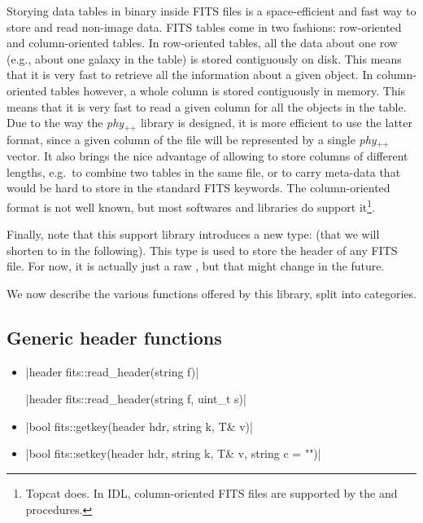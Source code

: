 \documentclass[12pt]{report}
\newcommand{\phypp}{\textit{phy}$_{\text{++}}$\xspace}
\begin{document}
Storying data tables in binary inside FITS files is a space-efficient and fast way to store and read non-image data. FITS tables come in two fashions: row-oriented and column-oriented tables. In row-oriented tables, all the data about one row (e.g., about one galaxy in the table) is stored contiguously on disk. This means that it is very fast to retrieve all the information about a given object. In column-oriented tables however, a whole column is stored contiguously in memory. This means that it is very fast to read a given column for all the objects in the table. Due to the way the \phypp library is designed, it is more efficient to use the latter format, since a given column of the file will be represented by a single \phypp vector. It also brings the nice advantage of allowing to store columns of different lengths, e.g.~to combine two tables in the same file, or to carry meta-data that would be hard to store in the standard FITS keywords. The column-oriented format is not well known, but most softwares and libraries do support it\footnote{Topcat does. In IDL, column-oriented FITS files are supported by the  and  procedures.}.

Finally, note that this support library introduces a new type:  (that we will shorten to  in the following). This type is used to store the header of any FITS file. For now, it is actually just a raw , but that might change in the future.

We now describe the various functions offered by this library, split into categories.

\subsection{Generic header functions}

\begin{itemize}
\item \cppinline|header fits::read_header(string f)| 

\cppinline|header fits::read_header(string f, uint_t s)|

\item \cppinline|bool fits::getkey(header hdr, string k, T& v)| 

\item \cppinline|bool fits::setkey(header hdr, string k, T& v, string c = "")| 


\end{itemize}
\end{document}

